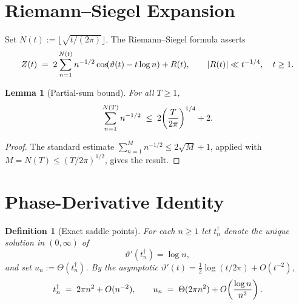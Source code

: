 \documentclass{amsart}
\newcommand{\assign}{:=}
\newtheorem{definition}{Definition}
\newtheorem{lemma}{Lemma}
\newcommand{\abs}[1]{\left| #1 \right|}
\begin{document}
\section{Riemann--Siegel Expansion}

Set $N (t) \assign \lfloor \sqrt{t / (2 \pi)} \rfloor$. The Riemann--Siegel
formula {\cite{Siegel1932,Titchmarsh1986}} asserts
\begin{equation}
  \label{eq:RS} Z (t) \hspace{0.27em} = \hspace{0.27em} 2 \sum_{n = 1}^{N (t)}
  n^{- 1 / 2} \cos \hspace{-0.17em} (\vartheta (t) - t \log n) + R (t), \qquad
  \abs{R (t)} \ll t^{- 1 / 4}, \quad t \ge 1.
\end{equation}
\begin{lemma}
  [Partial-sum bound]\label{lem:partial} For all $T \ge 1$,
  \[ \sum_{n = 1}^{N (T)} n^{- 1 / 2} \hspace{0.27em} \le \hspace{0.27em} 2
     \hspace{-0.17em} \left( \frac{T}{2 \pi} \right)^{1 / 4} + 2. \]
\end{lemma}

\begin{proof}
  The standard estimate $\sum_{n = 1}^M n^{- 1 / 2} \le 2 \sqrt{M} + 1$,
  applied with $M = N (T) \le (T / 2 \pi)^{1 / 2}$, gives the result.
\end{proof}

\section{Phase-Derivative Identity}

\begin{definition}
  [Exact saddle points]\label{def:saddle} For each $n \ge 1$ let
  $t_n^{\dagger}$ denote the unique solution in $(0, \infty)$ of
  \[ \vartheta' (t_n^{\dagger}) = \log n, \]
  and set $u_n \assign \Theta (t_n^{\dagger})$. By the asymptotic $\vartheta'
  (t) = \tfrac{1}{2} \log (t / 2 \pi) + O (t^{- 2})$,
  \[ t_n^{\dagger} \hspace{0.27em} = \hspace{0.27em} 2 \pi n^2 + O (n^{- 2}),
     \qquad u_n \hspace{0.27em} = \hspace{0.27em} \Theta (2 \pi n^2) + O
     \hspace{-0.17em} \left( \frac{\log n}{n^2} \right) . \]
\end{definition}
\end{document}
